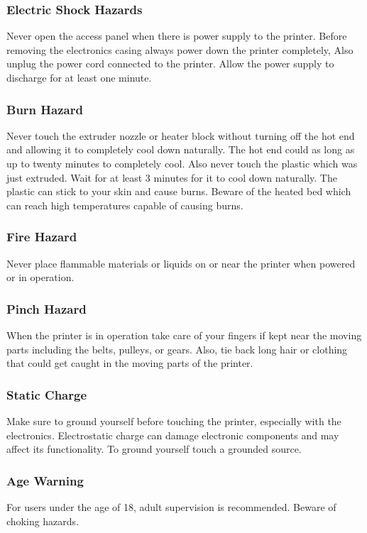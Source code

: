 \documentclass{article}
\begin{document}
\subsubsection{\textbf{Electric Shock Hazards}}
Never open the access panel when there is power supply to the printer. Before removing the electronics casing always power down the printer completely, Also unplug the power cord connected to the printer. Allow the power supply to discharge for at least one minute. 

\subsubsection{\textbf{Burn Hazard}}
Never touch the extruder nozzle or heater block without turning off the hot end and allowing it to completely cool down naturally. The hot end could as long as up to twenty minutes to completely cool. Also never touch the plastic which was just extruded. Wait for at least 3 minutes for it to cool down naturally.  The plastic can stick to your skin and cause burns. Beware of the heated bed which can reach high temperatures capable of causing burns. 

\subsubsection{\textbf{Fire Hazard}}
Never place flammable materials or liquids on or near the printer when powered or in operation. 

\subsubsection{\textbf{Pinch Hazard}}
When the printer is in operation take care of your fingers if kept near the moving parts including the belts, pulleys, or gears. Also, tie back long hair or clothing that could get caught in the moving parts of the printer. 

\subsubsection{\textbf{Static Charge }}
Make sure to ground yourself before touching the printer, especially with the electronics. Electrostatic charge can damage electronic components and may affect its functionality. To ground yourself touch a grounded source. 

\subsubsection{\textbf{Age Warning}}
For users under the age of 18, adult supervision is recommended. Beware of choking hazards.
\end{document}
